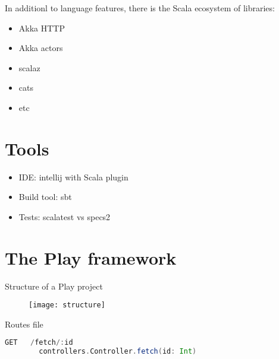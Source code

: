 \documentclass[10pt]{beamer}
\begin{document}
\begin{frame}
In additionl to language features, there is the Scala ecosystem  of libraries:
\begin{itemize}
\item Akka HTTP
\item Akka actors
\item scalaz 
\item cats
\item etc
\end{itemize}
\end{frame}


\section{Tools}

\begin{frame}
\begin{itemize}
\item IDE: intellij with Scala plugin
\item Build tool: sbt
\item Tests: scalatest vs specs2
\end{itemize}
\end{frame}

\section{The Play framework}
%
%

\begin{frame}
Structure of a Play project

\begin{figure}
\centering
\texttt{[image: structure]}
\end{figure}
\end{frame}





\begin{frame}[fragile]
Routes file
\begin{lstlisting}[language=Scala, basicstyle=\ttfamily]
GET   /fetch/:id   
        controllers.Controller.fetch(id: Int)
\end{lstlisting}
\end{frame}
\end{document}
